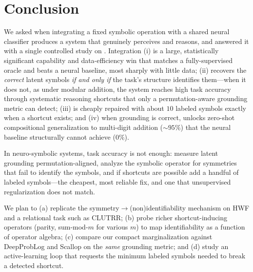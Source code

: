 \section{Conclusion}
\label{sec:conclusion}

We asked when integrating a fixed symbolic operation with a shared neural classifier produces a system
that genuinely perceives and reasons, and answered it with a single controlled study on \mnistadd.
Integration (i) is a large, statistically significant capability and data-efficiency win that matches a
fully-supervised oracle and beats a neural baseline, most sharply with little data; (ii) recovers the
\emph{correct} latent symbols \emph{if and only if} the task's structure identifies them---when it does
not, as under modular addition, the system reaches high task accuracy through systematic reasoning
shortcuts that only a permutation-aware grounding metric can detect; (iii) is cheaply repaired with
about $10$ labeled symbols exactly when a shortcut exists; and (iv) when grounding is correct, unlocks
zero-shot compositional generalization to multi-digit addition (${\sim}95\%$) that the neural baseline
structurally cannot achieve ($0\%$).

 In neuro-symbolic systems, task accuracy is not enough: measure latent grounding
permutation-aligned, analyze the symbolic operator for symmetries that fail to identify the symbols, and
if shortcuts are possible add a handful of labeled symbols---the cheapest, most reliable fix, and one
that unsupervised regularization does not match.

 We plan to (a) replicate the symmetry$\to$(non)identifiability mechanism on HWF and
a relational task such as CLUTRR; (b) probe richer shortcut-inducing operators (parity,
sum-mod-$m$ for various $m$) to map identifiability as a function of operator algebra; (c) compare our
compact marginalization against DeepProbLog and Scallop on the \emph{same} grounding metric; and (d)
study an active-learning loop that requests the minimum labeled symbols needed to break a detected
shortcut.
